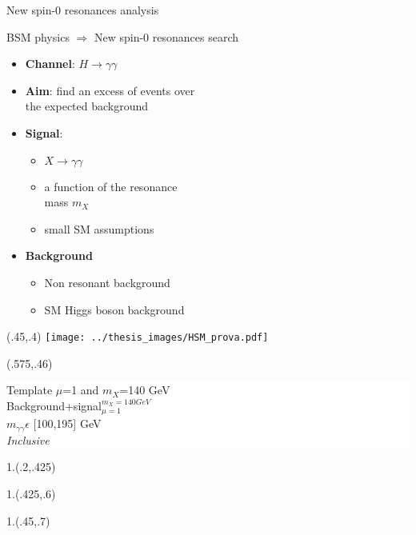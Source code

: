 \documentclass[10pt,UKenglish, leqno, xcolor = dvipsnames]{beamer}
\begin{document}
	\begin{frame}{New spin-0 resonances analysis}
		\vfill
		\begin{center}
			BSM physics $\Rightarrow$ New spin-0 resonances search
		\end{center}
		\begin{itemize}
			\item \textbf{Channel}: $H \to \gamma\gamma$
			\item \textbf{Aim}: find an excess of events over\\ the expected background
			\item \textbf{Signal}:
			\begin{itemize}
				\item $X \to \gamma\gamma$ 
				\item a function of the resonance\\ mass $m_X$
				\item small SM assumptions
			\end{itemize}
			\item \textbf{Background}
			\begin{itemize}
				\item Non resonant background
				\item SM Higgs boson background
			\end{itemize}
		\end{itemize}
		\vfill 
		\begin{textblock}{1}(.45,.4)
			\texttt{[image: ../thesis\_images/HSM\_prova.pdf]}
		\end{textblock}
		\begin{textblock}{1}(.575,.46)
			\colorbox{white}{
				\begin{minipage}{3.cm}
					\tiny
					Template $\mu$=1 and $m_X$=140 GeV\\
					Background+signal$_{\mu=1}^{m_X=140 GeV}$\\
					$m_{\gamma\gamma} \epsilon$ [100,195] GeV\\
					\textit{Inclusive}
				\end{minipage}
			}
		\end{textblock}
		
		\begin{textblock}{1.}(.2,.425)
		\end{textblock}
		\begin{textblock}{1.}(.425,.6)
		\end{textblock}
		\begin{textblock}{1.}(.45,.7)
		\end{textblock}
	\end{frame}
\end{document}
